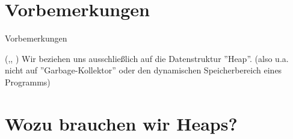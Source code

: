 \documentclass{beamer}
\newif\ifpauseswitch
\begin{document}
	
	\maketitle
	
	\usetikzlibrary{arrows.meta}
	\usetikzlibrary{shapes,arrows.meta,positioning}
	
	
	\section{Vorbemerkungen}
	
			\begin{frame}{Vorbemerkungen}
				\begin{vorbemerkung}
					(\cite{SMI21},\cite{CORMEN17}, \cite{DAVIS10})
					Wir beziehen uns ausschließlich auf die Datenstruktur ''Heap''.
					(also u.a. nicht auf ''Garbage-Kollektor'' oder den dynamischen Speicherbereich eines Programms)
				\end{vorbemerkung}
				\ifpauseswitch
					\pause
				\fi
			\end{frame}
	
	\section[Wozu brauchen wir Heaps?]{Wozu brauchen wir Heaps?}
	
\end{document}
